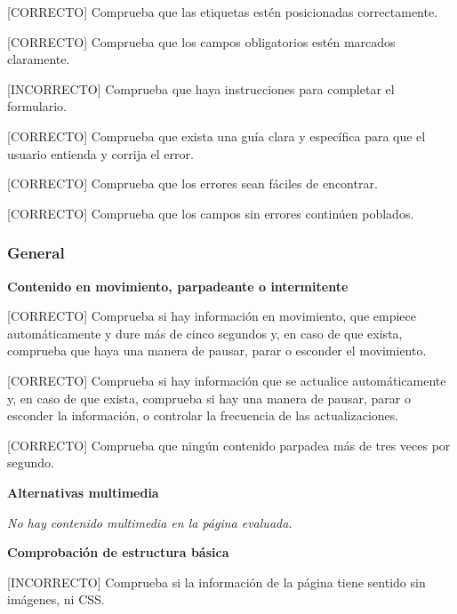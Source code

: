\documentclass[spanish]{article}
\begin{document}
[CORRECTO] Comprueba que las etiquetas estén posicionadas correctamente.\newline

[CORRECTO] Comprueba que los campos obligatorios estén marcados
claramente.\newline

[INCORRECTO] Comprueba que haya instrucciones para completar el formulario.\newline

[CORRECTO] Comprueba que exista una guía clara y específica para que el usuario
entienda y corrija el error.\newline

[CORRECTO] Comprueba que los errores sean fáciles de encontrar.\newline

[CORRECTO] Comprueba que los campos sin errores continúen poblados.

\subsubsection{General}

\textbf{Contenido en movimiento, parpadeante o intermitente}\newline

[CORRECTO] Comprueba si hay información en movimiento, que empiece
automáticamente y dure más de cinco segundos y, en caso de que exista, comprueba
que haya una manera de pausar, parar o esconder el movimiento.\newline

[CORRECTO] Comprueba si hay información que se actualice automáticamente y, en
caso de que exista, comprueba si hay una manera de pausar, parar o esconder la
información, o controlar la frecuencia de las actualizaciones.\newline

[CORRECTO] Comprueba que ningún contenido parpadea más de tres veces por
segundo.\newline

\textbf{Alternativas multimedia}\newline

\textit{No hay contenido multimedia en la página evaluada.}\newline

\newpage

\textbf{Comprobación de estructura básica}\newline

[INCORRECTO] Comprueba si la información de la página tiene sentido sin
imágenes, ni CSS.\newline
\end{document}
